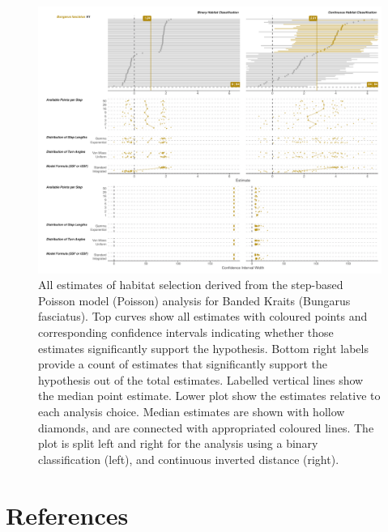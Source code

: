 \documentclass[10pt,a4paper]{article}
\begin{document}
\begin{figure}
\includegraphics[width=1\linewidth]{../../figures/specCurve_Bungarus fasciatus_pois} \caption{All estimates of habitat selection derived from the step-based Poisson model (Poisson) analysis for Banded Kraits (Bungarus fasciatus). Top curves show all estimates with coloured points and corresponding confidence intervals indicating whether those estimates significantly support the hypothesis. Bottom right labels provide a count of estimates that significantly support the hypothesis out of the total estimates. Labelled vertical lines show the median point estimate. Lower plot show the estimates relative to each analysis choice. Median estimates are shown with hollow diamonds, and are connected with appropriated coloured lines. The plot is split left and right for the analysis using a binary classification (left), and continuous inverted distance (right).}\label{fig:specCurvePoisBUFA}
\end{figure}

\section*{References}\label{references}
\end{document}
